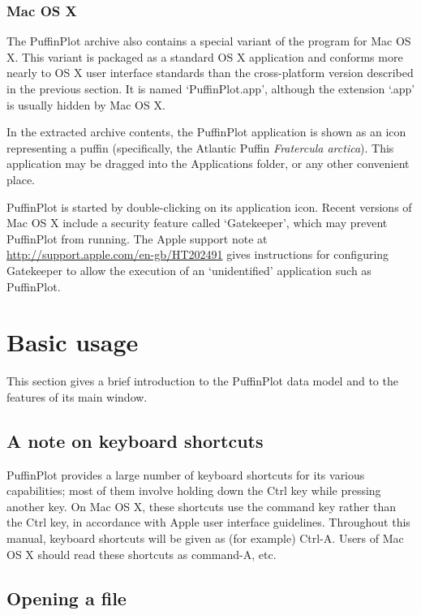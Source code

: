 \documentclass[a4paper,british]{article}
\begin{document}
\subsubsection{Mac OS X}

The PuffinPlot archive also contains a special variant of the program for Mac
OS X. This variant is packaged as a standard OS X application and conforms
more nearly to OS X user interface standards than the cross-platform version
described in the previous section. It is named `PuffinPlot.app', although 
the extension `.app' is usually hidden by Mac OS X.

In the extracted archive contents, the PuffinPlot application is shown
as an icon representing a puffin (specifically, the Atlantic Puffin
\emph{Fratercula arctica}). This application may be dragged into the
Applications folder, or any other convenient place.

PuffinPlot is started by double-clicking on its application icon. Recent
versions of Mac OS X include a security feature called `Gatekeeper',
which may prevent PuffinPlot from running. The Apple support note at
\url{http://support.apple.com/en-gb/HT202491} gives instructions for
configuring Gatekeeper to allow the execution of an `unidentified'
application such as PuffinPlot.

\section{Basic usage}

This section gives a brief introduction to the PuffinPlot data model and
to the features of its main window.

\subsection{A note on keyboard shortcuts}

PuffinPlot provides a large number of keyboard shortcuts for its various
capabilities; most of them involve holding down the Ctrl key while
pressing another key. On Mac OS X, these shortcuts use the command key
rather than the Ctrl key, in accordance with Apple user interface
guidelines. Throughout this manual, keyboard shortcuts will be given as
(for example) Ctrl-A. Users of Mac OS X should read these shortcuts as
command-A, etc.

\subsection{Opening a file}
\end{document}
